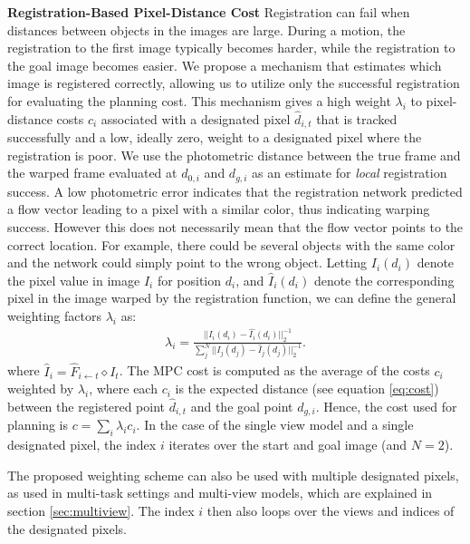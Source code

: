 \noindent \textbf{Registration-Based Pixel-Distance Cost}
Registration can fail when distances between objects in the images are large. During a motion, the registration to the first image typically becomes harder, while the registration to the goal image becomes easier. We propose a mechanism that estimates which image is registered correctly, allowing us to utilize only the successful registration for evaluating the planning cost. This mechanism gives a high weight $\lambda_i$ to pixel-distance costs $c_i$ associated with a designated pixel $\hat{d}_{i,t}$ that is tracked successfully and a low, ideally zero, weight to a designated pixel where the registration is poor. We use the photometric distance between the true frame and the warped frame evaluated at $d_{0,i}$ and $d_{g,i}$ as an estimate for \emph{local} registration success. A low photometric error indicates that the registration network predicted a flow vector leading to a pixel with a similar color, thus indicating warping success. However this does not necessarily mean that the flow vector points to the correct location. For example, there could be several objects with the same color and the network could simply point to the wrong object. Letting $I_i(d_i)$ denote the pixel value in image $I_i$ for position $d_i$, and $\hat{I}_i(d_i)$ denote the corresponding pixel in the image warped by the registration function, we can define the general weighting factors $\lambda_i$ as:
\begin{align}
\lambda_i =  \frac{||I_i(d_i) - \hat{I_i}(d_i)||_2^{-1}}{\sum^N_j ||I_j(d_j) - \hat{I}_j(d_j)||^{-1}_2}.
\label{eqn:cost_avg}
\end{align}
where $\hat{I}_i = \hat{F}_{i \leftarrow t} \diamond I_t$. The MPC cost is computed as the average of the costs $c_i$ weighted by $\lambda_i$, where each $c_i$ is the expected distance (see equation \ref{eq:cost}) between the registered point $\hat{d}_{i,t}$ and the goal point $d_{g,i}$. Hence, the cost used for planning is $c = \sum_i \lambda_i c_i$.  In the case of the single view model and a single designated pixel, the index $i$ iterates over the start and goal image (and $N=2$).

The proposed weighting scheme can also be used with multiple designated pixels, as used in multi-task settings and multi-view models, which are explained in section \ref{sec:multiview}. The index $i$ then also loops over the views and indices of the designated pixels.

